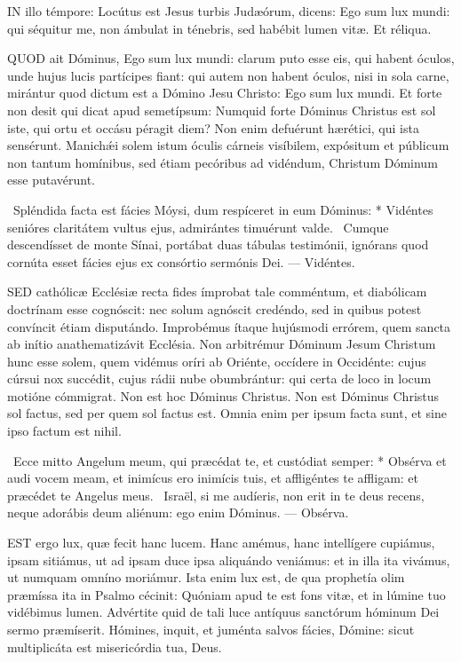 \lettrine[lines=2]{I}{N} illo témpore: Locútus est Jesus turbis Judæórum, dicens: Ego sum lux mundi: qui séquitur me, non ámbulat in ténebris, sed habébit lumen vitæ. Et réliqua.



\lettrine[lines=2]{Q}{UOD} ait Dóminus, Ego sum lux mundi: clarum puto esse eis, qui habent óculos, unde hujus lucis partícipes fiant: qui autem non habent óculos, nisi in sola carne, mirántur quod dictum est a Dómino Jesu Christo: Ego sum lux mundi. Et forte non desit qui dicat apud semetípsum: Numquid forte Dóminus Christus est sol iste, qui ortu et occásu péragit diem? Non enim defuérunt hærétici, qui ista sensérunt. Manichǽi solem istum óculis cárneis visíbilem, expósitum et públicum non tantum homínibus, sed étiam pecóribus ad vidéndum, Christum Dóminum esse putavérunt.

\R\ Spléndida facta est fácies Móysi, dum respíceret in eum Dóminus: * Vidéntes senióres claritátem vultus ejus, admirántes timuérunt valde. \V\ Cumque descendísset de monte Sínai, portábat duas tábulas testimónii, ignórans quod cornúta esset fácies ejus ex consórtio sermónis Dei. --- Vidéntes.


\lettrine[lines=2]{S}{ED} cathólicæ Ecclésiæ recta fides ímprobat tale comméntum, et diabólicam doctrínam esse cognóscit: nec solum agnóscit credéndo, sed in quibus potest convíncit étiam disputándo. Improbémus ítaque hujúsmodi errórem, quem sancta ab inítio anathematizávit Ecclésia. Non arbitrémur Dóminum Jesum Christum hunc esse solem, quem vidémus oríri ab Oriénte, occídere in Occidénte: cujus cúrsui nox succédit, cujus rádii nube obumbrántur: qui certa de loco in locum motióne cómmigrat. Non est hoc Dóminus Christus. Non est Dóminus Christus sol factus, sed per quem sol factus est. Omnia enim per ipsum facta sunt, et sine ipso factum est nihil.

\R\ Ecce mitto Angelum meum, qui præcédat te, et custódiat semper: * Obsérva et audi vocem meam, et inimícus ero inimícis tuis, et affligéntes te affligam: et præcédet te Angelus meus. \V\ Israël, si me audíeris, non erit in te deus recens, neque adorábis deum aliénum: ego enim Dóminus. --- Obsérva.


\lettrine[lines=2]{E}{ST} ergo lux, quæ fecit hanc lucem. Hanc amémus, hanc intellígere cupiámus, ipsam sitiámus, ut ad ipsam duce ipsa aliquándo veniámus: et in illa ita vivámus, ut numquam omníno moriámur. Ista enim lux est, de qua prophetía olim præmíssa ita in Psalmo cécinit: Quóniam apud te est fons vitæ, et in lúmine tuo vidébimus lumen. Advértite quid de tali luce antíquus sanctórum hóminum Dei sermo præmíserit. Hómines, inquit, et juménta salvos fácies, Dómine: sicut multiplicáta est misericórdia tua, Deus.

